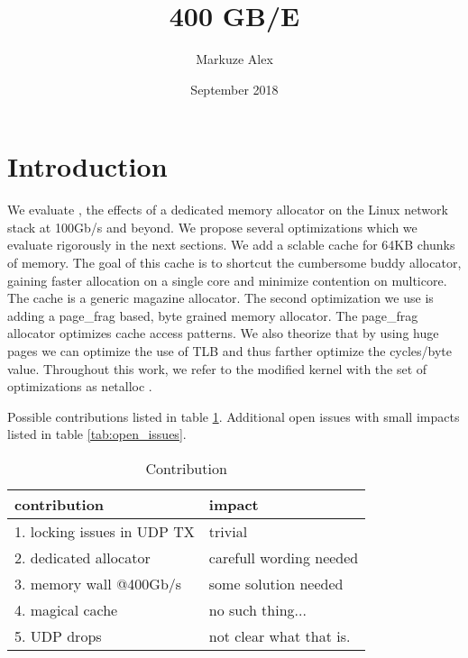\documentclass[sigplan,10pt]{acmart}
\title{400 GB/E}
\author{Markuze Alex}
\date{September 2018}
\newcommand{\oursys}{netalloc }
\begin{document}
\maketitle
\section{Introduction}
We evaluate , the effects of a dedicated memory allocator on the Linux network stack at 100Gb/s and beyond.
We propose several optimizations which we evaluate rigorously in the next sections. We add a sclable cache for 64KB chunks of memory. The goal of this cache is to shortcut the cumbersome buddy allocator, gaining faster allocation on a single core and minimize contention on multicore. The cache is a generic magazine allocator.
The second optimization we use is adding a page\_frag based, byte grained memory allocator. The page\_frag allocator optimizes cache access patterns.
We also theorize that by using huge pages we can optimize the use of TLB and thus farther optimize the cycles/byte value.
Throughout this work, we refer to the modified kernel with the set of optimizations as \oursys.

Possible contributions listed in table \ref{tab:contributions}.
Additional open issues with small impacts listed in table \ref{tab:open_issues}.
\begin{table}[b]
\centering
\begin{tabular}{l|l}
contribution & impact \\\hline
1. locking issues in UDP TX & trivial\\
2. dedicated allocator & carefull wording needed\\
3. memory wall @400Gb/s & some solution needed\\
4. magical cache & no such thing...\\
5. UDP drops & not clear what that is.\\
\hline
\end{tabular}
\caption{\label{tab:contributions}Contribution}
\end{table}

\newpage



\renewcommand\footnotetextcopyrightpermission[1]{}
\end{document}

